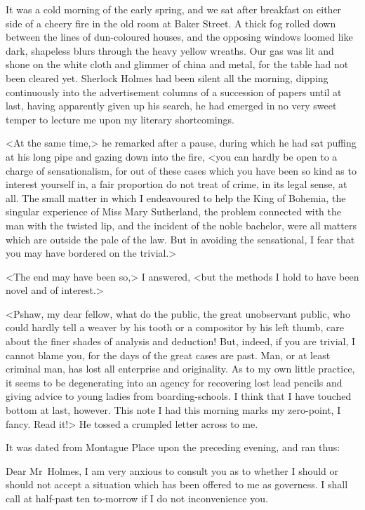 It was a cold morning of the early spring, and we sat after breakfast on either side of a cheery fire in the old room at Baker Street. A thick fog rolled down between the lines of dun-coloured houses, and the opposing windows loomed like dark, shapeless blurs through the heavy yellow wreaths. Our gas was lit and shone on the white cloth and glimmer of china and metal, for the table had not been cleared yet. Sherlock Holmes had been silent all the morning, dipping continuously into the advertisement columns of a succession of papers until at last, having apparently given up his search, he had emerged in no very sweet temper to lecture me upon my literary shortcomings.

<At the same time,> he remarked after a pause, during which he had sat puffing at his long pipe and gazing down into the fire, <you can hardly be open to a charge of sensationalism, for out of these cases which you have been so kind as to interest yourself in, a fair proportion do not treat of crime, in its legal sense, at all. The small matter in which I endeavoured to help the King of Bohemia, the singular experience of Miss Mary Sutherland, the problem connected with the man with the twisted lip, and the incident of the noble bachelor, were all matters which are outside the pale of the law. But in avoiding the sensational, I fear that you may have bordered on the trivial.>

<The end may have been so,> I answered, <but the methods I hold to have been novel and of interest.>

<Pshaw, my dear fellow, what do the public, the great unobservant public, who could hardly tell a weaver by his tooth or a compositor by his left thumb, care about the finer shades of analysis and deduction! But, indeed, if you are trivial, I cannot blame you, for the days of the great cases are past. Man, or at least criminal man, has lost all enterprise and originality. As to my own little practice, it seems to be degenerating into an agency for recovering lost lead pencils and giving advice to young ladies from boarding-schools. I think that I have touched bottom at last, however. This note I had this morning marks my zero-point, I fancy. Read it!> He tossed a crumpled letter across to me.

It was dated from Montague Place upon the preceding evening, and ran thus:

\begin{mail}{}{Dear Mr~Holmes,}
I am very anxious to consult you as to whether I should or should not accept a situation which has been offered to me as governess. I shall call at half-past ten to-morrow if I do not inconvenience you. 
	
\end{mail}

